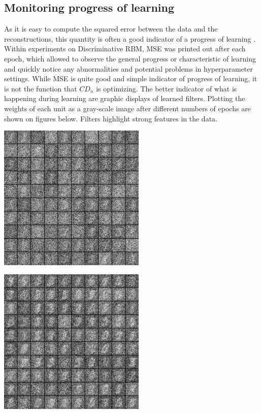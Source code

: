 \documentclass[a4paper]{scrartcl}
\begin{document}
\subsection{Monitoring progress of learning}
As it is easy to compute the squared error between the data and the reconstructions, this quantity is often a good indicator of a progress of learning \cite{Hinton}. Within experiments on Discriminative RBM, MSE was printed out after each epoch, which allowed to observe the general progress or characteristic of learning and quickly notice any abnormalities and potential problems in hyperparameter settings. 
While MSE is quite good and simple indicator of progress of learning, it is not the function that $CD_n$ is optimizing. The better indicator of what is happening during learning are graphic displays of learned filters. Plotting the weights of each unit as a gray-scale image after different numbers of epochs are shown on figures below. Filters highlight strong features in the data.
\begin{minipage}[t]{0.5\textwidth}
\includegraphics[width=7cm]{images/filtry_1epoch_50train.png}
\end{minipage}
\begin{minipage}[t]{0.5\textwidth}
\includegraphics[width=7cm]{images/filtry_5epoch_50train.png}
\end{minipage}
\end{document}
